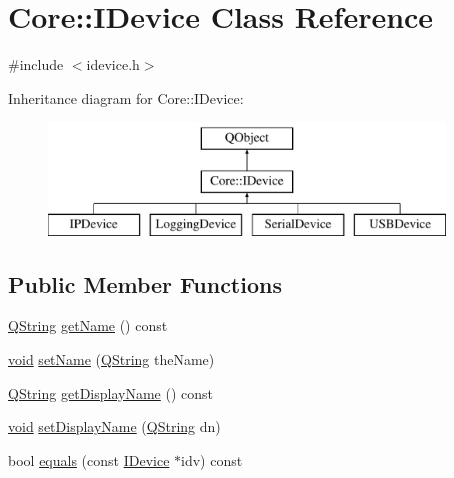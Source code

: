 \hypertarget{class_core_1_1_i_device}{\section{Core\-:\-:I\-Device Class Reference}
\label{class_core_1_1_i_device}
}


{\ttfamily \#include $<$idevice.\-h$>$}

Inheritance diagram for Core\-:\-:I\-Device\-:\begin{figure}[H]
\begin{center}
\leavevmode
\includegraphics[height=3.000000cm]{class_core_1_1_i_device}
\end{center}
\end{figure}
\subsection*{Public Member Functions}
\begin{DoxyCompactItemize}
\item 
\hyperlink{group___u_a_v_objects_plugin_gab9d252f49c333c94a72f97ce3105a32d}{Q\-String} \hyperlink{group___core_plugin_ga815e1b550a4ffe8dbb76636026146145}{get\-Name} () const 
\item 
\hyperlink{group___u_a_v_objects_plugin_ga444cf2ff3f0ecbe028adce838d373f5c}{void} \hyperlink{group___core_plugin_ga10075657372ad8ae53f7b18c697b9498}{set\-Name} (\hyperlink{group___u_a_v_objects_plugin_gab9d252f49c333c94a72f97ce3105a32d}{Q\-String} the\-Name)
\item 
\hyperlink{group___u_a_v_objects_plugin_gab9d252f49c333c94a72f97ce3105a32d}{Q\-String} \hyperlink{group___core_plugin_ga8504228d03605f9d90209f4117f4a987}{get\-Display\-Name} () const 
\item 
\hyperlink{group___u_a_v_objects_plugin_ga444cf2ff3f0ecbe028adce838d373f5c}{void} \hyperlink{group___core_plugin_ga6dc9f15ee9f6cf8ed6e60d0aa0ff15e8}{set\-Display\-Name} (\hyperlink{group___u_a_v_objects_plugin_gab9d252f49c333c94a72f97ce3105a32d}{Q\-String} dn)
\item 
bool \hyperlink{group___core_plugin_gac5c0277c3690da70fcb203767846a1ed}{equals} (const \hyperlink{class_core_1_1_i_device}{I\-Device} $\ast$idv) const 
\end{DoxyCompactItemize}


